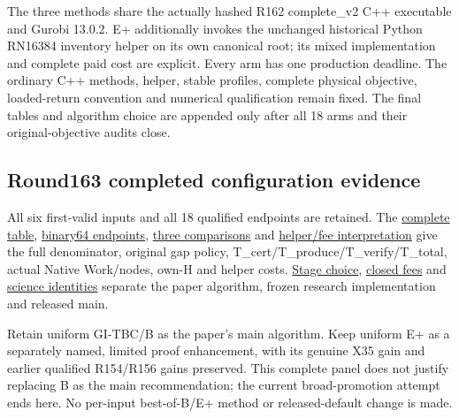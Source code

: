 \documentclass[
  american,
  11pt,
]{article}
\begin{document}
The three methods share the actually hashed R162 complete\_\allowbreak{}v2 C++
executable and Gurobi 13.0.2. E+ additionally invokes the unchanged
historical Python RN16384 inventory helper on its own canonical root;
its mixed implementation and complete paid cost are explicit. Every arm
has one production deadline. The ordinary C++ methods, helper, stable
profiles, complete physical objective, loaded-return convention and
numerical qualification remain fixed. The final tables and algorithm
choice are appended only after all 18 arms and their original-objective
audits close.

\subsection{Round163 completed configuration
evidence}\label{round163-completed-configuration-evidence}

All six first-valid inputs and all 18 qualified endpoints are retained.
The
\href{https://github.com/yifanXovo/TailoredExact/blob/codex/round172-journal-manuscript/results/unified_exact_round163/reports/complete.csv}{complete
table},
\href{https://github.com/yifanXovo/TailoredExact/blob/codex/round172-journal-manuscript/results/unified_exact_round163/reports/complete_arms.json}{binary64
endpoints},
\href{https://github.com/yifanXovo/TailoredExact/blob/codex/round172-journal-manuscript/results/unified_exact_round163/reports/comparisons.csv}{three
comparisons} and
\href{https://github.com/yifanXovo/TailoredExact/blob/codex/round172-journal-manuscript/results/unified_exact_round163/final_report.md}{helper/fee
interpretation} give the full denominator, original gap policy,
T\_\allowbreak{}cert/T\_\allowbreak{}produce/T\_\allowbreak{}verify/T\_\allowbreak{}total, actual Native Work/nodes, own-H
and helper costs.
\href{https://github.com/yifanXovo/TailoredExact/blob/codex/round172-journal-manuscript/results/unified_exact_round163/decision.json}{Stage
choice},
\href{https://github.com/yifanXovo/TailoredExact/blob/codex/round172-journal-manuscript/results/unified_exact_round163/cost_report.json}{closed
fees} and
\href{https://github.com/yifanXovo/TailoredExact/blob/codex/round172-journal-manuscript/results/unified_exact_round163/science_identity.json}{science
identities} separate the paper algorithm, frozen research implementation
and released main.

Retain uniform GI-TBC/B as the paper's main algorithm. Keep uniform E+
as a separately named, limited proof enhancement, with its genuine X35
gain and earlier qualified R154/R156 gains preserved. This complete
panel does not justify replacing B as the main recommendation; the
current broad-promotion attempt ends here. No per-input best-of-B/E+
method or released-default change is made.
\end{document}
